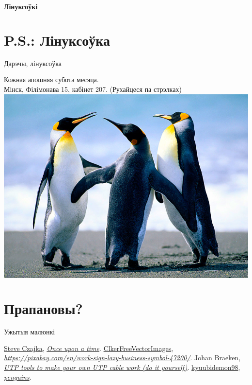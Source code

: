 \documentclass[ignorenonframetext,hyperref={pdftex,unicode}]{beamer}
\begin{document}
		\item \textbf{Лінуксоўкі} 
			\pause

\section{P.S.: Лінуксоўка}
\begin{frame}{Дарэчы, лінуксоўка}
	\begin{center}
		Кожная апошняя субота месяца.\\
		Мінск, Філімонава 15, кабінет 207. (Рухайцеся па стрэлках)
		\includegraphics[width=\textwidth,height=0.8\textheight,keepaspectratio]{penguins_by_kyuubidemon98}
	\end{center}
\end{frame}

\section{Прапановы?}

\begin{frame}{Ужытыя малюнкі}
	\begin{thebibliography}{10}
	\beamertemplatetextbibitems
		{\sc \href{https://www.flickr.com/photos/steveczajka/}{Steve Czajka}}, {\em \href{https://www.flickr.com/photos/steveczajka/11392783794}{Once upon a time}}.
		{\sc \href{https://pixabay.com/en/users/ClkerFreeVectorImages-3736/}{ClkerFreeVectorImages}}, {\em \url{https://pixabay.com/en/work-sign-lazy-business-symbol-47200/}}.
		{\sc Johan Braeken}, {\em \href{https://commons.wikimedia.org/wiki/File:Utp_diy_tools.jpg}{UTP tools to make your own UTP cable work (do it yourself)}}.
		{\sc \href{http://kyuubidemon98.deviantart.com/}{kyuubidemon98}}, {\em \href{http://kyuubidemon98.deviantart.com/art/penguins-156283137}{penguins}}.
	\end{thebibliography}
\end{frame}
\end{document}

